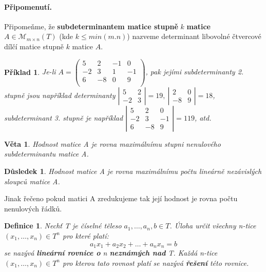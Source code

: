 \documentclass[12pt,a4paper]{article}
\newtheorem{definition}{Definice}
\newtheorem{sentence}{Věta}
\newtheorem{example}{Příklad}
\newtheorem{result}{Důsledek}
\begin{document}
\paragraph{Připomenutí.} Připomeňme, že \textbf{subdeterminantem matice stupně} $k$ \textbf{matice}  $A \in \mathscr{M}_{m \times n}(T)$ (kde $k \leq min(m.n)$) nazveme determinant libovolné čtvercové dílčí matice stupně $k$ matice $A$.

\begin{example}
Je-li $
	A = \left( \begin{array}{cccc}
	5 & 2 & -1 & 0  \\
	-2 & 3 & 1 & -1 \\
	6 & -8 & 0 & 9 \\
	\end{array}\right)
$, pak jejími subdeterminanty 2. stupně jsou například determinanty $\left| \begin{array}{cc} 5 & 2\\ -2 & 3 \end{array}\right| = 19, \ \left| \begin{array}{cc} 2 & 0\\ -8 & 9 \end{array}\right| = 18$, \\subdeterminant 3. stupně je například $\left| \begin{array}{ccc} 5 & 2 & 0\\ -2 & 3 & -1 \\ 6 & -8 & 9 \end{array}\right| = 119$, atd.
\end{example}

\begin{sentence}
	Hodnost matice A je rovna maximálnímu stupni nenulového subdeterminantu matice A.
\end{sentence}

\begin{result}
	Hodnost matice A je rovna maximálnímu počtu lineárně nezávislých sloupců matice A.
\end{result}
Jinak řečeno pokud matici A zredukujeme tak její hodnost je rovna počtu nenulových řádků.

\begin{definition}
	Nechť T je číselné těleso $a_1,\dots, a_n,b \in T$. Úloha určit všechny n-tice $(x_1, \dots, x_n) \in T^n$ pro které platí: $$a_1 x_1 + a_2 x_2 + \dots + a_n x_n = b$$ se nazývá \textbf{lineární rovnice o} n \textbf{neznámých nad} T. Každá n-tice $(x_1, \dots, x_n) \in T^n$ pro kterou tato rovnost platí se nazývá \textbf{řešení} této rovnice.
\end{definition}
\end{document}
